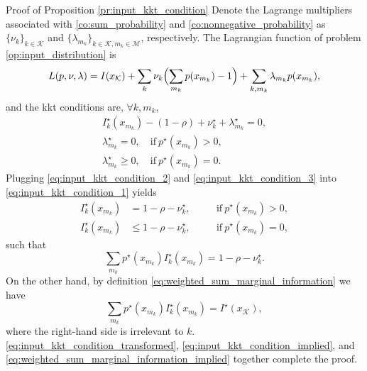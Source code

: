 \documentclass[journal]{IEEEtran}
\begin{document}
\begin{appendix}
	\begin{subsection}{Proof of Proposition \ref{pr:input_kkt_condition}}
		Denote the Lagrange multipliers associated with \eqref{co:sum_probability} and \eqref{co:nonnegative_probability} as $\{\nu_k\}_{k \in \mathcal{K}}$ and $\{\lambda_{m_k}\}_{k \in \mathcal{K},m_k \in \mathcal{M}}$, respectively.
		The Lagrangian function of problem \eqref{op:input_distribution} is
		\begin{equation}
			L(p, \nu, \lambda) = I(x_{\mathcal{K}}) + \sum_k \nu_k \Bigl( \sum_{m_k} p(x_{m_k}) - 1 \Bigr) + \sum_{k,m_k} \lambda_{m_k} p(x_{m_k}),
		\end{equation}
		and the \gls{kkt} conditions are, $\forall k,m_k$,
		\begin{subequations}
			\label{eq:input_kkt_condition_original}
			\begin{gather}
				I_k^\star(x_{m_k}) - (1 - \rho) + \nu_k^\star + \lambda_{m_k}^\star = 0, \label{eq:input_kkt_condition_1} \\
				\lambda_{m_k}^\star = 0, \quad    \text{if} \ p^\star(x_{m_k}) > 0, \label{eq:input_kkt_condition_2} \\
				\lambda_{m_k}^\star \ge 0, \quad  \text{if} \ p^\star(x_{m_k}) = 0 \label{eq:input_kkt_condition_3}.
			\end{gather}
		\end{subequations}
		Plugging \eqref{eq:input_kkt_condition_2} and \eqref{eq:input_kkt_condition_3} into \eqref{eq:input_kkt_condition_1} yields
		\begin{subequations}
			\label{eq:input_kkt_condition_transformed}
			\begin{alignat}{2}
				I_k^\star(x_{m_k}) & = 1 - \rho - \nu_k^\star, \quad   &  & \text{if} \ p^\star(x_{m_k}) > 0,\label{eq:probable_states_marginal} \\
				I_k^\star(x_{m_k}) & \le 1 - \rho - \nu_k^\star, \quad &  & \text{if} \ p^\star(x_{m_k}) = 0,\label{eq:dropped_states_marginal}
			\end{alignat}
		\end{subequations}
		such that
		\begin{equation}
			\sum_{m_k} p^\star(x_{m_k}) I_k^\star(x_{m_k}) = 1 - \rho - \nu_k^\star.
			\label{eq:input_kkt_condition_implied}
		\end{equation}
		On the other hand, by definition \eqref{eq:weighted_sum_marginal_information} we have
		\begin{equation}
			\sum_{m_k} p^\star(x_{m_k}) I_k^\star(x_{m_k}) = I^\star(x_{\mathcal{K}}),
			\label{eq:weighted_sum_marginal_information_implied}
		\end{equation}
		where the right-hand side is irrelevant to $k$.
		\eqref{eq:input_kkt_condition_transformed}, \eqref{eq:input_kkt_condition_implied}, and \eqref{eq:weighted_sum_marginal_information_implied} together complete the proof.
		\label{ap:input_kkt_condition}
	\end{subsection}


\end{appendix}
\end{document}
